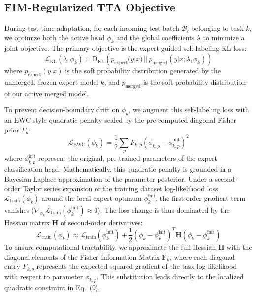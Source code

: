 \documentclass{article}
\theoremstyle{plain}
\theoremstyle{definition}
\theoremstyle{remark}
\begin{document}
\subsection{FIM-Regularized TTA Objective}
During test-time adaptation, for each incoming test batch $\mathcal{B}_t$ belonging to task $k$, we optimize both the active head $\phi_k$ and the global coefficients $\lambda$ to minimize a joint objective. The primary objective is the expert-guided self-labeling KL loss:
\begin{equation}
    \mathcal{L}_{\text{KL}}(\lambda, \phi_k) = \text{D}_{\text{KL}} \left( p_{\text{expert}}(y|x) \,||\, p_{\text{merged}}(y|x; \lambda, \phi_k) \right)
\end{equation}
where $p_{\text{expert}}(y|x)$ is the soft probability distribution generated by the unmerged, frozen expert model $k$, and $p_{\text{merged}}$ is the soft probability distribution of our active merged model.

To prevent decision-boundary drift on $\phi_k$, we augment this self-labeling loss with an EWC-style quadratic penalty scaled by the pre-computed diagonal Fisher prior $F_k$:
\begin{equation}
    \mathcal{L}_{\text{EWC}}(\phi_k) = \frac{1}{2} \sum_p F_{k, p} \left( \phi_{k, p} - \phi_{k, p}^{\text{init}} \right)^2
\end{equation}
where $\phi_{k, p}^{\text{init}}$ represent the original, pre-trained parameters of the expert classification head. Mathematically, this quadratic penalty is grounded in a Bayesian Laplace approximation of the parameter posterior. Under a second-order Taylor series expansion of the training dataset log-likelihood loss $\mathcal{L}_{\text{train}}(\phi_k)$ around the local expert optimum $\phi_k^{\text{init}}$, the first-order gradient term vanishes ($\nabla_{\phi_k} \mathcal{L}_{\text{train}}(\phi_k^{\text{init}}) \approx 0$). The loss change is thus dominated by the Hessian matrix $\mathbf{H}$ of second-order derivatives:
\begin{equation}
    \mathcal{L}_{\text{train}}(\phi_k) \approx \mathcal{L}_{\text{train}}(\phi_k^{\text{init}}) + \frac{1}{2} (\phi_k - \phi_k^{\text{init}})^T \mathbf{H} (\phi_k - \phi_k^{\text{init}})
\end{equation}
To ensure computational tractability, we approximate the full Hessian $\mathbf{H}$ with the diagonal elements of the Fisher Information Matrix $\mathbf{F}_k$, where each diagonal entry $F_{k, p}$ represents the expected squared gradient of the task log-likelihood with respect to parameter $\phi_{k, p}$. This substitution leads directly to the localized quadratic constraint in Eq.~(9).
\end{document}
